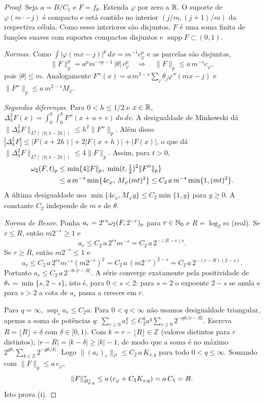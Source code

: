 \documentclass[12pt,a4paper]{article}
\begin{document}
\begin{proof}
Seja $a=B/C_1$ e $F=f_\theta$. Estenda $\varphi$ por zero a $\mathbb R$. O suporte de $\varphi(m\cdot-j)$ é compacto e está contido no interior $(j/m,(j+1)/m)$ da respectiva célula. Como esses interiores são disjuntos, $F$ é uma soma finita de funções suaves com suportes compactos disjuntos e $\operatorname{supp}F\subset(0,1)$.

\emph{Normas.} Como $\int|\varphi(mx-j)|^p\,dx=m^{-1}c_\varphi^p$ e as parcelas são disjuntas,
\[
\|F\|_p^p=a^pm^{-sp-1}\,|\theta|\,c_\varphi^p
\quad\Longrightarrow\quad \|F\|_p\le a\,m^{-s}c_\varphi,
\]
pois $|\theta|\le m$. Analogamente $F''(x)=a\,m^{2-s}\sum_j\theta_j\varphi''(mx-j)$ e $\|F''\|_p\le a\,m^{2-s}M_\varphi$.

\emph{Segundas diferenças.} Para $0<h\le1/2$ e $x\in\mathbb R$, $\Delta_h^2F(x)=\int_0^h\!\int_0^h F''(x+u+v)\,du\,dv$. A desigualdade de Minkowski dá $\|\Delta_h^2F\|_{L^p([0,1-2h])}\le h^2\|F''\|_p$. Além disso $|\Delta_h^2F|\le|F(x+2h)|+2|F(x+h)|+|F(x)|$, o que dá $\|\Delta_h^2F\|_{L^p([0,1-2h])}\le4\|F\|_p$. Assim, para $t>0$,
\begin{align*}
\omega_2(F,t)_{p}&\le\min\{4\|F\|_p,\ \min(t,\tfrac12)^2\|F''\|_p\}\\
&\le a\,m^{-s}\min\{4c_\varphi,\,M_\varphi(mt)^2\}\le C_2\,a\,m^{-s}\min\{1,(mt)^2\}.
\end{align*}
A última desigualdade usa $\min\{4c_\varphi,M_\varphi y\}\le C_2\min\{1,y\}$ para $y\ge0$. A constante $C_2$ independe de $m$ e de $\theta$.

\emph{Norma de Besov.} Ponha $a_r=2^{rs}\omega_2(F,2^{-r})_{p}$ para $r\in\mathbb N_0$ e $R=\log_2 m$ (real). Se $r\le R$, então $m2^{-r}\ge1$ e
\[
a_r\le C_2\,a\,2^{rs}m^{-s}=C_2\,a\,2^{-(R-r)s}.
\]
Se $r\ge R$, então $m2^{-r}\le1$ e
\[
a_r\le C_2\,a\,2^{rs}m^{-s}(m2^{-r})^2=C_2\,a\,(m2^{-r})^{2-s}=C_2\,a\,2^{-(r-R)(2-s)}.
\]
Portanto $a_r\le C_2\,a\,2^{-\theta_*|r-R|}$. A série converge exatamente pela positividade de $\theta_*=\min\{s,2-s\}$, isto é, para $0<s<2$: para $s=2$ o expoente $2-s$ se anula e para $s>2$ a cota de $a_r$ passa a crescer em $r$.

Para $q=\infty$, $\sup_r a_r\le C_2a$. Para $0<q<\infty$ não usamos desigualdade triangular, apenas a soma de potências $q$: $\sum_{r\ge0}a_r^q\le C_2^qa^q\sum_{r\ge0}2^{-q\theta_*|r-R|}$. Escreva $R=\lfloor R\rfloor+\delta$ com $\delta\in[0,1)$. Com $k=r-\lfloor R\rfloor\in\mathbb Z$ (valores distintos para $r$ distintos), $|r-R|=|k-\delta|\ge|k|-1$, de modo que a soma é no máximo $2^{q\theta_*}\sum_{k\in\mathbb Z}2^{-q\theta_*|k|}$. Logo $\|(a_r)_r\|_{\ell^q}\le C_2\,a\,K_{s,q}$ para todo $0<q\le\infty$. Somando com $\|F\|_p\le a\,c_\varphi$,
\[
\|F\|^*_{B^{s}_{p,q}}\le a\,(c_\varphi+C_2K_{s,q})=a\,C_1=B.
\]
Isto prova (i).


\end{proof}
\end{document}
